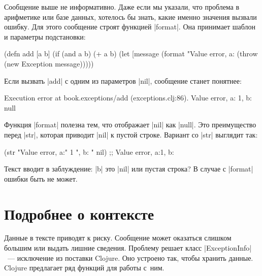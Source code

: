 Сообщение выше не информативно. Даже если мы указали, что проблема в арифметике
или базе данных, хотелось бы знать, какие именно значения вызвали ошибку. Для
этого сообщение строят функцией \spverb|format|. Она принимает шаблон и
параметры подстановки:


\begin{english}
  \begin{clojure}
(defn add [a b]
  (if (and a b)
    (+ a b)
    (let [message (format "Value error, a: %
      (throw (new Exception message)))))
  \end{clojure}
\end{english}

\noindent
Если вызвать \spverb|add| с одним из параметров \spverb|nil|, сообщение станет
понятнее:

\begin{english}
  \begin{clojure}
Execution error at book.exceptions/add (exceptions.clj:86).
Value error, a: 1, b: null
  \end{clojure}
\end{english}

Функция \spverb|format| полезна тем, что отображает \spverb|nil| как
\spverb|null|. Это преимущество перед \spverb|str|, которая приводит
\spverb|nil| к пустой строке. Вариант со \spverb|str| выглядит так:

\begin{english}
  \begin{clojure}
(str "Value error, a:" 1 ", b: " nil)
;; Value error, a:1, b:
  \end{clojure}
\end{english}

\noindent
Текст вводит в заблуждение: \spverb|b| это \spverb|nil| или пустая строка? В
случае с \spverb|format| ошибки быть не может.

\section{Подробнее о контексте}


Данные в тексте приводят к риску. Сообщение может оказаться слишком большим или
выдать лишние сведения. Проблему решает класс \spverb|ExceptionInfo|~---
исключение из поставки Clojure. Оно устроено так, чтобы хранить данные. Clojure
предлагает ряд функций для работы с~ним.

